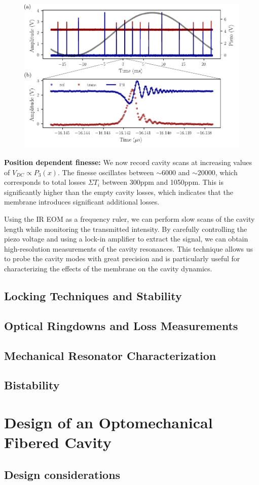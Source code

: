 \begin{figure}[h!]
    \centering  
    \includegraphics[width=\textwidth]{./chap5/fig/scans_ringdown.pdf}
    \caption{ }
    \label{fig:tilt}
\end{figure}



\noindent \textbf{Position dependent finesse: } We now record cavity scans at increasing values of $V_{DC}\propto P_3(x)$. The finesse oscillates between $\sim 6000$ and $\sim 20000$, which corresponds to total losses $\Sigma T_i$ between 300ppm and 1050ppm. This is significantly higher than the empty cavity losses, which indicates that the membrane introduces significant additional losses. 

Using the IR EOM as a frequency ruler, we can perform slow scans of the cavity length while monitoring the transmitted intensity. By carefully controlling the piezo voltage and using a lock-in amplifier to extract the signal, we can obtain high-resolution measurements of the cavity resonances. This technique allows us to probe the cavity modes with great precision and is particularly useful for characterizing the effects of the membrane on the cavity dynamics.
\subsection{Locking Techniques and Stability}
\subsection{Optical Ringdowns and Loss Measurements}
\subsection{Mechanical Resonator Characterization}
\subsection{Bistability}

\section{Design of an Optomechanical Fibered Cavity}
\subsection{Design considerations}

\vspace{-\baselineskip}

